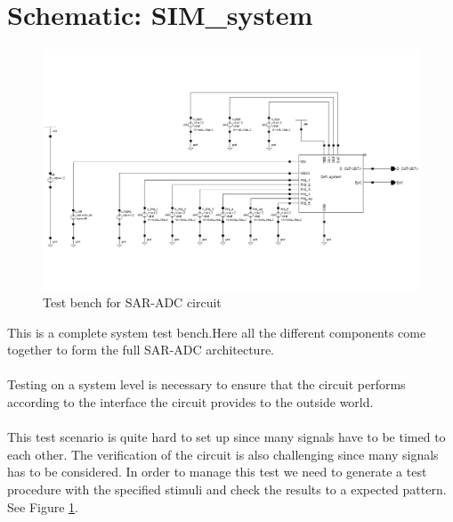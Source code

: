 \documentclass[english, a4paper,11pt]{article}
\begin{document}
\section*{Schematic: SIM\_system}
\begin{figure}[!ht]
 \centering
   \includegraphics[width=\textwidth]{img/SIM_system.png}
   \caption{Test bench for SAR-ADC circuit}
   \label{sim:system}
\end{figure}
This is a complete system test bench.Here all the different components come together to form the full SAR-ADC architecture.\\ 
\\
Testing on a system level is necessary to ensure that the circuit performs according to the interface the circuit provides to the outside world.\\
\\
This test scenario is quite hard to set up since many signals have to be timed to each other. The verification of the circuit is also challenging since many signals has to be considered.
In order to manage this test we need to generate a test procedure with the specified stimuli and check the results to a expected pattern.
See Figure \ref{sim:system}.
\end{document}
